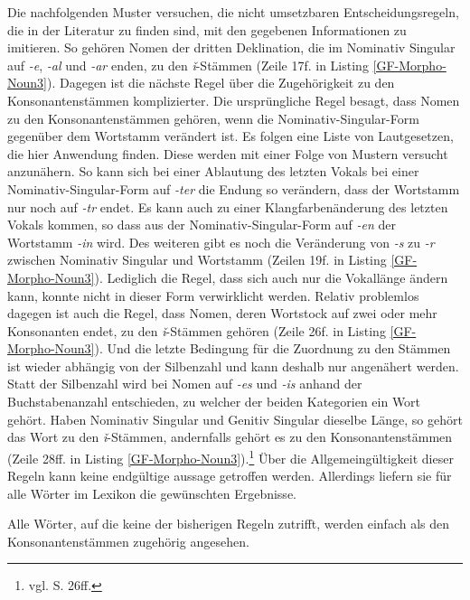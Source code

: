 Die nachfolgenden Muster versuchen, die nicht umsetzbaren Entscheidungsregeln, die in der Literatur zu finden sind, mit den gegebenen Informationen zu imitieren. So gehören Nomen der dritten Deklination, die im Nominativ Singular auf \textit{-e}, \textit{-al} und \textit{-ar} enden, zu den \textit{ǐ}-Stämmen (Zeile 17f. in Listing \ref{GF-Morpho-Noun3}). Dagegen ist die nächste Regel über die Zugehörigkeit zu den Konsonantenstämmen komplizierter. Die ursprüngliche Regel besagt, dass Nomen zu den Konsonantenstämmen gehören, wenn die Nominativ-Singular-Form gegenüber dem Wortstamm verändert ist. Es folgen eine Liste von Lautgesetzen, die hier Anwendung finden. Diese werden mit einer Folge von Mustern versucht anzunähern. So kann sich bei einer Ablautung des letzten Vokals bei einer Nominativ-Singular-Form auf \textit{-ter} die Endung so verändern, dass der Wortstamm nur noch auf \textit{-tr} endet. Es kann auch zu einer Klangfarbenänderung des letzten Vokals kommen, so dass aus der Nominativ-Singular-Form auf \textit{-en} der Wortstamm \textit{-in} wird. Des weiteren gibt es noch die Veränderung von \textit{-s} zu \textit{-r} zwischen Nominativ Singular und Wortstamm (Zeilen 19f. in Listing \ref{GF-Morpho-Noun3}). Lediglich die Regel, dass sich auch nur die Vokallänge ändern kann, konnte nicht in dieser Form verwirklicht werden. Relativ problemlos dagegen ist auch die Regel, dass Nomen, deren Wortstock auf zwei oder mehr Konsonanten endet, zu den \textit{ǐ}-Stämmen gehören (Zeile 26f. in Listing \ref{GF-Morpho-Noun3}). Und die letzte Bedingung für die Zuordnung zu den Stämmen ist wieder abhängig von der Silbenzahl und kann deshalb nur angenähert werden. Statt der Silbenzahl wird bei Nomen auf \textit{-es} und \textit{-is} anhand der Buchstabenanzahl entschieden, zu welcher der beiden Kategorien ein Wort gehört. Haben Nominativ Singular und Genitiv Singular dieselbe Länge, so gehört das Wort zu den \textit{ǐ}-Stämmen, andernfalls gehört es zu den Konsonantenstämmen (Zeile 28ff. in Listing \ref{GF-Morpho-Noun3}).\footnote{vgl. \cite{BAYER-LINDAUER1994} S. 26ff.} Über die Allgemeingültigkeit dieser Regeln kann keine endgültige aussage getroffen werden. Allerdings liefern sie für alle Wörter im Lexikon die gewünschten Ergebnisse.\par
Alle Wörter, auf die keine der bisherigen Regeln zutrifft, werden einfach als den Konsonantenstämmen zugehörig angesehen. \par
